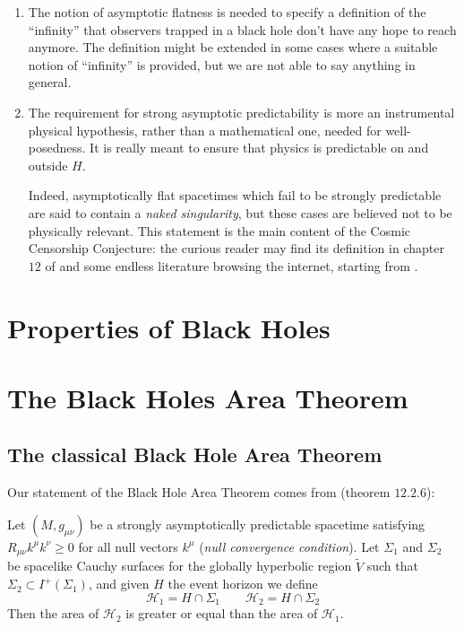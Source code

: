 \begin{remark}
	\begin{enumerate}[label=(\Roman*)]
		\item The notion of asymptotic flatness is needed to specify a definition of the ``infinity'' that observers trapped in a black hole don't have any hope to reach anymore. The definition might be extended in some cases where a suitable notion of ``infinity'' is provided, but we are not able to say anything in general.
		\item The requirement for strong asymptotic predictability is more an instrumental physical hypothesis, rather than a mathematical one, needed for well-posedness. It is really meant to ensure that physics is predictable on and outside \(H\).
		
		Indeed, asymptotically flat spacetimes which fail to be strongly predictable are said to contain a \emph{naked singularity}, but these cases are believed not to be physically relevant. This statement is the main content of the Cosmic Censorship Conjecture: the curious reader may find its definition in chapter \(12\) of \cite{wald2010general} and some endless literature browsing the internet, starting from \cite{dias2018strong}.
	\end{enumerate}
\end{remark}


\section{Properties of Black Holes}

\section{The Black Holes Area Theorem}

\subsection{The classical Black Hole Area Theorem}
\label{subsec:classical-bh-area}

Our statement of the Black Hole Area Theorem comes from \cite{wald2010general} (theorem \(12.2.6\)):
\begin{theorem}
	\label{th:classical-bh-area}
	Let \((M, g_{\mu\nu})\) be a strongly asymptotically predictable spacetime satisfying \(R_{\mu\nu}k^{\mu}k^{\nu} \ge 0\) for all null vectors \(k^{\mu}\) (\emph{null convergence condition}). Let \(\Sigma_1\) and \(\Sigma_2\) be spacelike Cauchy surfaces for the globally hyperbolic region \(\tilde{V}\) such that \(\Sigma_2 \subset I^+(\Sigma_1)\), and given \(H\) the event horizon we define
	\[
	\mathscr{H}_1 = H \cap \Sigma_1 \quad \quad \mathscr{H}_2 = H \cap \Sigma_2
	\]
	Then the area of \(\mathscr{H}_2\) is greater or equal than the area of \(\mathscr{H}_1\).
\end{theorem}

